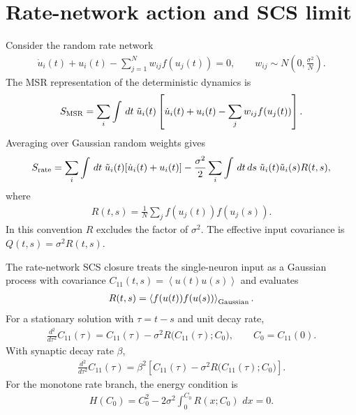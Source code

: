 \documentclass[pre,preprint,preprintnumbers,aps,eqsecnum,superscriptaddress,notitlepage,showpacs,floatfix]{revtex4-1}
\newcommand{\dd}{\,d}
\newcommand{\avg}[1]{\left\langle #1 \right\rangle}
\begin{document}
\section{Rate-network action and SCS limit}
\label{sec:rate_action}

Consider the random rate network
\begin{align}
\dot u_i(t)+u_i(t)-\sum_{j=1}^N w_{ij}f(u_j(t))=0,
\qquad
w_{ij}\sim N\!\left(0,\frac{\sigma^2}{N}\right).
\label{eq:rate_network}
\end{align}
The MSR representation of the deterministic dynamics is
\begin{align}
S_{\rm MSR}
=
\sum_i\int\dd t\;\tilde u_i(t)
\left[
\dot u_i(t)+u_i(t)-\sum_j w_{ij}f(u_j(t))
\right].
\label{eq:rate_MSR_before_avg}
\end{align}
Averaging over Gaussian random weights gives
\begin{align}
S_{\rm rate}
=
\sum_i\int\dd t\;\tilde u_i(t)[\dot u_i(t)+u_i(t)]
-
\frac{\sigma^2}{2}\sum_i\int\dd t\dd s\;
\tilde u_i(t)\tilde u_i(s)R(t,s),
\label{eq:rate_action_avg}
\end{align}
where
\begin{align}
R(t,s)=\frac1N\sum_j f(u_j(t))f(u_j(s)).
\label{eq:R_rate_def}
\end{align}
In this convention $R$ excludes the factor of $\sigma^2$.  The effective input
covariance is $Q(t,s)=\sigma^2R(t,s)$.

The rate-network SCS closure treats the single-neuron input as a Gaussian
process with covariance $C_{11}(t,s)=\avg{u(t)u(s)}$ and evaluates
\begin{align}
R(t,s)=\avg{f(u(t))f(u(s))}_{\rm Gaussian}.
\label{eq:R_gaussian_rate}
\end{align}
For a stationary solution with $\tau=t-s$ and unit decay rate,
\begin{align}
\frac{d^2}{d\tau^2}C_{11}(\tau)
=
C_{11}(\tau)-\sigma^2 R\bigl(C_{11}(\tau);C_0\bigr),
\qquad C_0=C_{11}(0).
\label{eq:SCS_unit_beta}
\end{align}
With synaptic decay rate $\beta$,
\begin{align}
\frac{d^2}{d\tau^2}C_{11}(\tau)
=
\beta^2\left[C_{11}(\tau)-\sigma^2 R\bigl(C_{11}(\tau);C_0\bigr)\right].
\label{eq:SCS_beta}
\end{align}
For the monotone rate branch, the energy condition is
\begin{align}
H(C_0)
=
C_0^2-2\sigma^2\int_0^{C_0}R(x;C_0)\,\dd x=0.
\label{eq:rate_energy}
\end{align}
\end{document}
